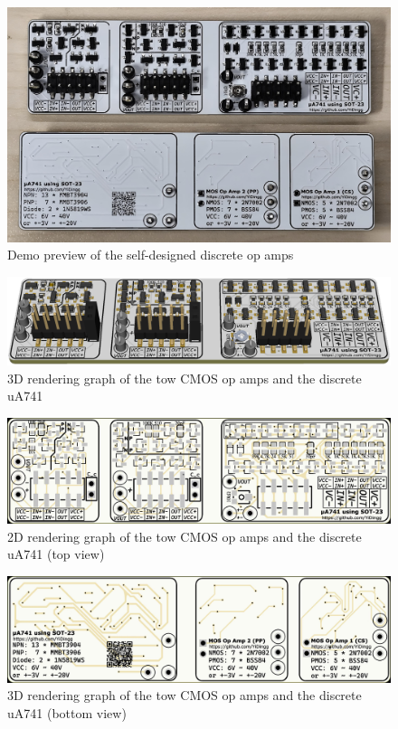 \documentclass[UTF8]{article}
\begin{document}
\begin{figure}[H]\centering
    \includegraphics[width=\columnwidth]{LCE-06-07-运放设计/assets/demo.jpg}
    \caption{Demo preview of the self-designed discrete op amps}
\end{figure}

\begin{figure}[H]\centering
    \includegraphics[width=\columnwidth]{LCE-06-07-运放设计/assets/3D.png}
    \caption{3D rendering graph of the tow CMOS op amps and the discrete uA741}
\end{figure}

\begin{figure}[H]\centering
    \includegraphics[width=\columnwidth]{LCE-06-07-运放设计/assets/2D top.jpeg}
    \caption{2D rendering graph of the tow CMOS op amps and the discrete uA741 (top view)}
\end{figure}

\begin{figure}[H]\centering
    \includegraphics[width=\columnwidth]{LCE-06-07-运放设计/assets/2D bottom.jpeg}
    \caption{3D rendering graph of the tow CMOS op amps and the discrete uA741 (bottom view)}
\end{figure}
\end{document}
